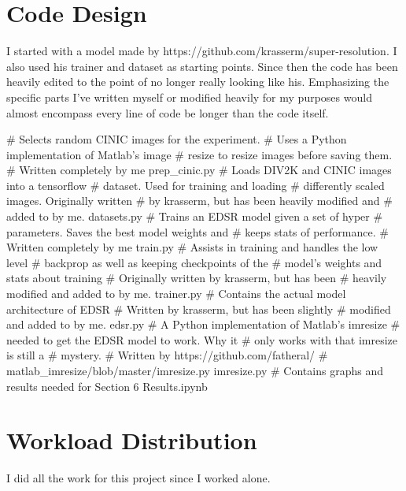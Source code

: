 \documentclass[conference]{IEEEtran}
\begin{document}
\section*{Code Design}
I started with a model made by https://github.com/krasserm/super-resolution.
I also used his trainer and dataset as starting points.
Since then the code has been heavily edited to the point of no longer really looking like his.
Emphasizing the specific parts I've written myself or modified heavily for my purposes would almost encompass every line of code be longer than the code itself.
\begin{python}
  # Selects random CINIC images for the experiment.
  # Uses a Python implementation of Matlab's image
  # resize to resize images before saving them.
  # Written completely by me
  prep_cinic.py
  # Loads DIV2K and CINIC images into a tensorflow
  # dataset. Used for training and loading
  # differently scaled images. Originally written
  # by krasserm, but has been heavily modified and
  # added to by me.
  datasets.py
  # Trains an EDSR model given a set of hyper
  # parameters. Saves the best model weights and
  # keeps stats of performance.
  # Written completely by me
  train.py
  # Assists in training and handles the low level
  # backprop as well as keeping checkpoints of the
  # model's weights and stats about training
  # Originally written by krasserm, but has been
  # heavily modified and added to by me.
  trainer.py
  # Contains the actual model architecture of EDSR
  # Written by krasserm, but has been slightly
  # modified and added to by me.
  edsr.py
  # A Python implementation of Matlab's imresize
  # needed to get the EDSR model to work. Why it
  # only works with that imresize is still a
  # mystery.
  # Written by https://github.com/fatheral/
  # matlab_imresize/blob/master/imresize.py
  imresize.py
  # Contains graphs and results needed for Section 6
  Results.ipynb
\end{python}

\section*{Workload Distribution}

I did all the work for this project since I worked alone.
\end{document}

